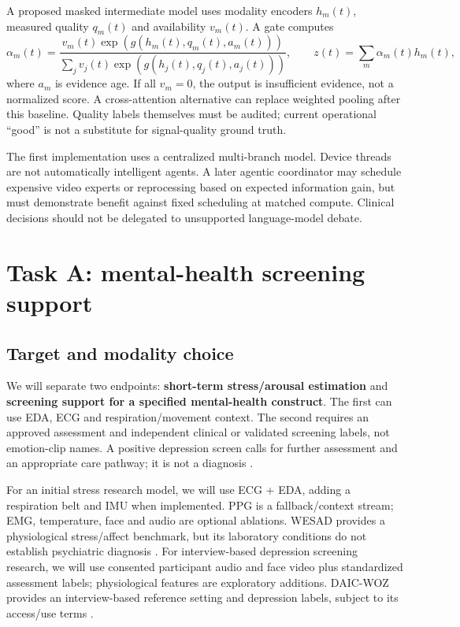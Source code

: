 \documentclass[11pt,a4paper]{article}
\begin{document}
A proposed masked intermediate model uses modality encoders $h_m(t)$, measured quality $q_m(t)$ and availability $v_m(t)$. A gate computes
\[
\alpha_m(t)=\frac{v_m(t)\exp(g(h_m(t),q_m(t),a_m(t)))}
{\sum_j v_j(t)\exp(g(h_j(t),q_j(t),a_j(t)))},\qquad
z(t)=\sum_m\alpha_m(t)h_m(t),
\]
where $a_m$ is evidence age. If all $v_m=0$, the output is insufficient evidence, not a normalized score. A cross-attention alternative can replace weighted pooling after this baseline. Quality labels themselves must be audited; current operational ``good'' is not a substitute for signal-quality ground truth.

The first implementation uses a centralized multi-branch model. Device threads are not automatically intelligent agents. A later agentic coordinator may schedule expensive video experts or reprocessing based on expected information gain, but must demonstrate benefit against fixed scheduling at matched compute. Clinical decisions should not be delegated to unsupported language-model debate.

\section{Task A: mental-health screening support}
\subsection{Target and modality choice}
We will separate two endpoints: \textbf{short-term stress/arousal estimation} and \textbf{screening support for a specified mental-health construct}. The first can use EDA, ECG and respiration/movement context. The second requires an approved assessment and independent clinical or validated screening labels, not emotion-clip names. A positive depression screen calls for further assessment and an appropriate care pathway; it is not a diagnosis \cite{uspstf}.

For an initial stress research model, we will use ECG + EDA, adding a respiration belt and IMU when implemented. PPG is a fallback/context stream; EMG, temperature, face and audio are optional ablations. WESAD provides a physiological stress/affect benchmark, but its laboratory conditions do not establish psychiatric diagnosis \cite{wesad}. For interview-based depression screening research, we will use consented participant audio and face video plus standardized assessment labels; physiological features are exploratory additions. DAIC-WOZ provides an interview-based reference setting and depression labels, subject to its access/use terms \cite{daic}.
\end{document}
